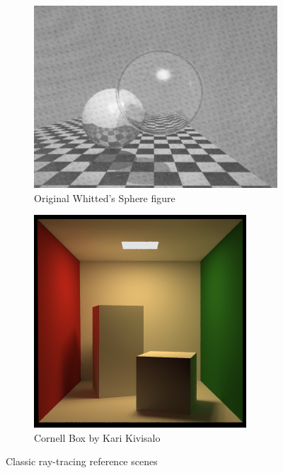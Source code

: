 \documentclass[11pt]{article}
\begin{document}
\begin{figure}[htb]
  \centering
  \begin{subfigure}[htb]{0.48\textwidth}
    \includegraphics[width=\textwidth]{resources/whitted_original}
    \caption{Original Whitted's Sphere figure \cite{whitted1980improved}}
  \end{subfigure}
  \hspace{1.25em}
  \begin{subfigure}[htb]{0.42\textwidth}
    \includegraphics[width=\textwidth]{resources/cornell_box}
    \caption{Cornell Box by Kari Kivisalo \cite{cornell2003render}}
  \end{subfigure}
  \caption{Classic ray-tracing reference scenes}
  \label{fig:reference_scenes}
\end{figure}
\end{document}

